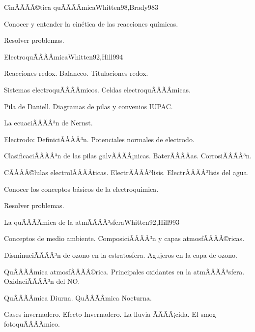 \begin{sumilla}
\begin{unit}{CinÃÂÃÂ©tica quÃÂÃÂ­mica}{Whitten98,Brady98}{3}
   \begin{objetivos}
      \item Conocer y entender la cin\'etica de las reacciones qu\'imicas.
      \item Resolver problemas.
   \end{objetivos}
\end{unit}

\begin{unit}{ElectroquÃÂÃÂ­mica}{Whitten92,Hill99}{4}
\begin{topicos}
      \item Reacciones redox. Balanceo. Titulaciones redox.
      \item Sistemas electroquÃÂÃÂ­micos. Celdas electroquÃÂÃÂ­micas.
      \item Pila de Daniell. Diagramas de pilas y convenios IUPAC.
      \item La ecuaciÃÂÃÂ³n de Nernst.
      \item Electrodo: DefiniciÃÂÃÂ³n. Potenciales normales de electrodo.
      \item ClasificaciÃÂÃÂ³n de las pilas galvÃÂÃÂ¡nicas. BaterÃÂÃÂ­as. CorrosiÃÂÃÂ³n.
      \item CÃÂÃÂ©lulas electrolÃÂÃÂ­ticas. ElectrÃÂÃÂ³lisis. ElectrÃÂÃÂ³lisis del agua.
   \end{topicos}

   \begin{objetivos}
      \item Conocer los conceptos b\'asicos de la electroqu\'imica.
      \item Resolver problemas.
   \end{objetivos}
\end{unit}

\begin{unit}{La quÃÂÃÂ­mica de la atmÃÂÃÂ³sfera}{Whitten92,Hill99}{3}
\begin{topicos}
      \item Conceptos de medio ambiente. ComposiciÃÂÃÂ³n y capas atmosfÃÂÃÂ©ricas.
      \item DisminuciÃÂÃÂ³n de ozono en la estratosfera. Agujeros en la capa de ozono.
      \item QuÃÂÃÂ­mica atmosfÃÂÃÂ©rica. Principales oxidantes en la atmÃÂÃÂ³sfera. OxidaciÃÂÃÂ³n del NO.
      \item QuÃÂÃÂ­mica Diurna. QuÃÂÃÂ­mica Nocturna.
      \item Gases invernadero. Efecto Invernadero. La lluvia ÃÂÃÂ¡cida. El smog fotoquÃÂÃÂ­mico.
    \end{topicos}


\end{unit}
\end{sumilla}

